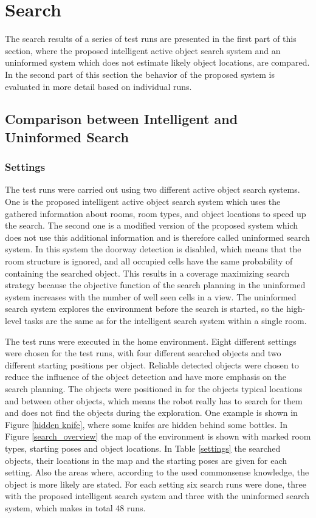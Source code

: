 \section{Search}

The search results of a series of test runs are presented in the first part of this section, where the proposed intelligent active object search system and an uninformed system which does not estimate likely object locations, are compared. In the second part of this section the behavior of the proposed system is evaluated in more detail based on individual runs. 

\subsection{Comparison between Intelligent and Uninformed Search} \label{tests}

\subsubsection{Settings}

The test runs were carried out using two different active object search systems. One is the proposed intelligent active object search system which uses the gathered information about rooms, room types, and object locations to speed up the search. The second one is a modified version of the proposed system which does not use this additional information and is therefore called uninformed search system. In this system the doorway detection is disabled, which means that the room structure is ignored, and all occupied cells have the same probability of containing the searched object. This results in a coverage maximizing search strategy because the objective function of the search planning in the uninformed system increases with the number of well seen cells in a view. The uninformed search system explores the environment before the search is started, so the high-level tasks are the same as for the intelligent search system within a single room.

The test runs were executed in the home environment. Eight different settings were chosen for the test runs, with four different searched objects and two different starting positions per object. Reliable detected objects were chosen to reduce the influence of the object detection and have more emphasis on the search planning. The objects were positioned in for the objects typical locations and between other objects, which means the robot really has to search for them and does not find the objects during the exploration. One example is shown in Figure \ref{hidden knife}, where some knifes are hidden behind some bottles. In Figure \ref{search_overview} the map of the environment is shown with marked room types, starting poses and object locations. In Table \ref{settings} the searched objects, their locations in the map and the starting poses are given for each setting. Also the areas where, according to the used commonsense knowledge, the object is more likely are stated. For each setting six search runs were done, three with the proposed intelligent search system and three with the uninformed search system, which makes in total 48 runs. 

